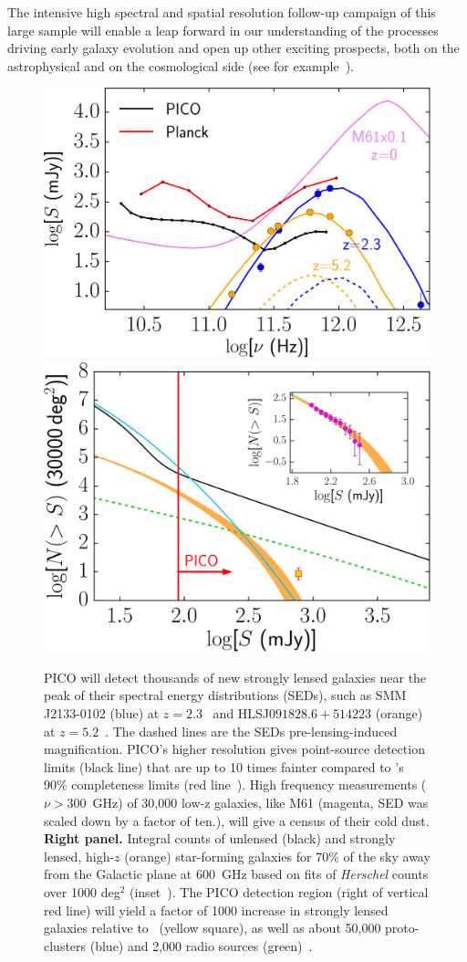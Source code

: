 \documentclass[PICOReport.tex]{subfiles}
\begin{document}
The intensive high spectral and spatial resolution follow-up campaign of this large sample will enable a leap forward in our understanding of the processes driving early galaxy evolution and open up other exciting prospects, both on the astrophysical and on the cosmological side (see for example~\citet{Treu2010}).
\begin{figure}[h]
\begin{center}
\includegraphics[width=0.416\columnwidth, trim={0 0 0 0cm}, clip]{images/fig_SED_PICO.pdf}
\hspace{0.75cm}
\includegraphics[width=0.4\columnwidth, trim={0 0 0 0cm}, clip]{images/NgtF_pico_NEWNEW.pdf}
\vskip-0.3cm
\caption{  PICO will detect thousands of new strongly lensed galaxies near the peak of their spectral energy distributions (SEDs), such as SMM\,J2133-0102 (blue)  at $z=2.3$~\cite{Swinbank2010} and HLSJ$091828.6{+}514223$ (orange) at $z=5.2$~\cite{Combes2012}. The dashed lines are the SEDs pre-lensing-induced magnification. PICO's higher resolution gives point-source detection limits (black line) that are up to 10 times fainter compared to \planck 's 90\% completeness limits (red line~\cite{PCCS2}). High frequency measurements ($\nu>300$~GHz) of 30,000 low-z galaxies, like M61 (magenta, SED was scaled down by a factor of ten.), will give a census of their cold dust.  {\bf Right panel.} Integral counts of unlensed (black) and strongly lensed, high-$z$ (orange) star-forming galaxies for 70\% of the sky away from the Galactic plane at 600~GHz based on fits of \textit{Herschel} counts over 1000 deg$^2$ (inset~\citep{Negrello2017lensed}). The PICO detection region (right of vertical red line) will yield a factor of 1000 increase in strongly lensed galaxies relative to \planck~(yellow square), as well as about 50,000 proto-clusters (blue) and 2,000 radio sources (green)~\citep{Negrello2017protocl}. }
\label{fig:SED3}
\end{center}
\vspace{-0.15in}
\end{figure}
\end{document}
